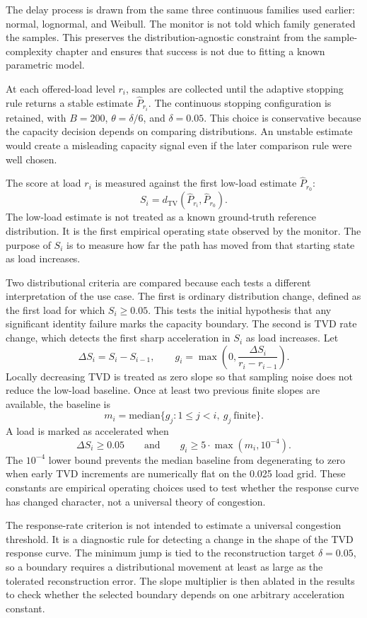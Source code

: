 \documentclass[a4paper,11pt]{report}
\begin{document}
The delay process is drawn from the same three continuous families used earlier: normal, lognormal, and Weibull. The monitor is not told which family generated the samples. This preserves the distribution-agnostic constraint from the sample-complexity chapter and ensures that success is not due to fitting a known parametric model.

At each offered-load level \(r_i\), samples are collected until the adaptive stopping rule returns a stable estimate \(\widehat{P}_{r_i}\). The continuous stopping configuration is retained, with \(B=200\), \(\theta=\delta/6\), and \(\delta=0.05\). This choice is conservative because the capacity decision depends on comparing distributions. An unstable estimate would create a misleading capacity signal even if the later comparison rule were well chosen.

The score at load \(r_i\) is measured against the first low-load estimate \(\widehat{P}_{r_0}\):
\[
S_i =
d_{\mathrm{TV}}\left(\widehat{P}_{r_i},\widehat{P}_{r_0}\right).
\]
The low-load estimate is not treated as a known ground-truth reference distribution. It is the first empirical operating state observed by the monitor. The purpose of \(S_i\) is to measure how far the path has moved from that starting state as load increases.

Two distributional criteria are compared because each tests a different interpretation of the use case. The first is ordinary distribution change, defined as the first load for which \(S_i \geq 0.05\). This tests the initial hypothesis that any significant identity failure marks the capacity boundary. The second is TVD rate change, which detects the first sharp acceleration in \(S_i\) as load increases. Let
\[
\Delta S_i = S_i-S_{i-1}, \qquad
g_i = \max\left(0,\frac{\Delta S_i}{r_i-r_{i-1}}\right).
\]
Locally decreasing TVD is treated as zero slope so that sampling noise does not reduce the low-load baseline. Once at least two previous finite slopes are available, the baseline is
\[
m_i = \mathrm{median}\{g_j: 1 \leq j < i,\ g_j\ \mathrm{finite}\}.
\]
A load is marked as accelerated when
\[
\Delta S_i \geq 0.05
\qquad \mathrm{and} \qquad
g_i \geq 5 \cdot \max(m_i,10^{-4}).
\]
The \(10^{-4}\) lower bound prevents the median baseline from degenerating to zero when early TVD increments are numerically flat on the 0.025 load grid. These constants are empirical operating choices used to test whether the response curve has changed character, not a universal theory of congestion.

The response-rate criterion is not intended to estimate a universal congestion threshold. It is a diagnostic rule for detecting a change in the shape of the TVD response curve. The minimum jump is tied to the reconstruction target \(\delta=0.05\), so a boundary requires a distributional movement at least as large as the tolerated reconstruction error. The slope multiplier is then ablated in the results to check whether the selected boundary depends on one arbitrary acceleration constant.
\end{document}
